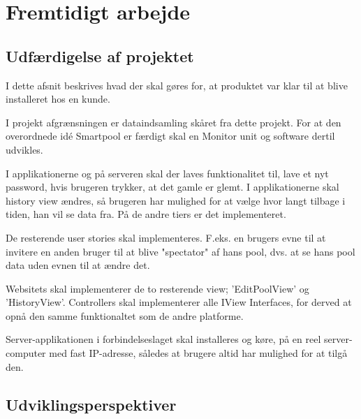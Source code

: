 \chapter{Fremtidigt arbejde}
\section{Udfærdigelse af projektet}
I dette afsnit beskrives hvad der skal gøres for, at produktet var klar til at blive installeret hos en kunde.

I projekt afgrænsningen er dataindsamling skåret fra dette projekt. For at den overordnede idé Smartpool er færdigt skal en Monitor unit og software dertil udvikles.

I applikationerne og på serveren skal der laves funktionalitet til, lave et nyt password, hvis brugeren trykker, at det gamle er glemt.
I applikationerne skal history view ændres, så brugeren har mulighed for at vælge hvor langt tilbage i tiden, han vil se data fra. På de andre tiers er det implementeret.

De resterende user stories skal implementeres. F.eks. en brugers evne til at invitere en anden bruger til at blive "spectator" af hans pool, dvs. at se hans pool data uden evnen til at ændre det.

Websitets skal implementerer de to resterende view; 'EditPoolView' og 'HistoryView'. Controllers skal implementerer alle IView Interfaces, for derved at opnå den samme funktionaltet som de andre platforme.

Server-applikationen i forbindelseslaget skal installeres og køre, på en reel server-computer med fast IP-adresse, således at brugere altid har mulighed for at tilgå den.


\section{Udviklingsperspektiver}
